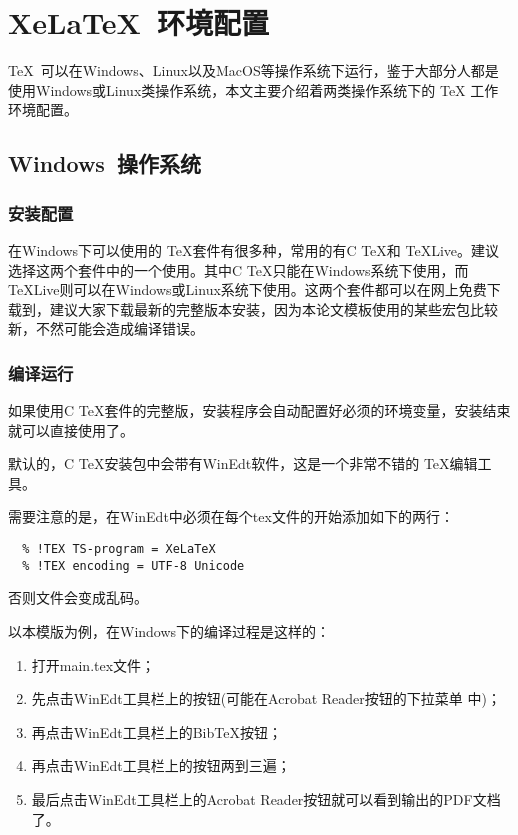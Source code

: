 
%
%
%

\chapter{XeLaTeX~环境配置}
\label{chap02}

\TeX{}~可以在Windows、Linux以及MacOS等操作系统下运行，鉴于大部分人都是使用Windows或Linux类操作系统，本文主要介绍着两类操作系统下的 \TeX{} 工作环境配置。

\section{Windows~操作系统}

\subsection{安装配置}
在Windows下可以使用的 \TeX{}套件有很多种，常用的有C \TeX{}和 \TeX{}Live。建议选择这两个套件中的一个使用。其中C \TeX{}只能在Windows系统下使用，而 \TeX{}Live则可以在Windows或Linux系统下使用。这两个套件都可以在网上免费下载到，建议大家下载最新的完整版本安装，因为本论文模板使用的某些宏包比较新，不然可能会造成编译错误。

\subsection{编译运行}
如果使用C \TeX{}套件的完整版，安装程序会自动配置好必须的环境变量，安装结束就可以直接使用了。

默认的，C \TeX{}安装包中会带有WinEdt软件，这是一个非常不错的 \TeX{}编辑工具。

需要注意的是，在WinEdt中必须在每个tex文件的开始添加如下的两行：
\begin{lstlisting}
  % !TEX TS-program = XeLaTeX
  % !TEX encoding = UTF-8 Unicode
\end{lstlisting}
否则文件会变成乱码。

以本模版为例，在Windows下的编译过程是这样的：
\begin{enumerate}
\item 打开main.tex文件；
\item 先点击WinEdt工具栏上的\XeLaTeX{}按钮(可能在Acrobat Reader按钮的下拉菜单
  中)；
\item 再点击WinEdt工具栏上的Bib\TeX{}按钮；
\item 再点击WinEdt工具栏上的\XeLaTeX{}按钮两到三遍；
\item 最后点击WinEdt工具栏上的Acrobat Reader按钮就可以看到输出的PDF文档了。
\end{enumerate}

